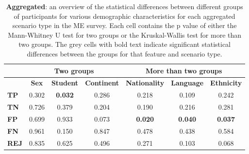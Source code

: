 \begin{table}
    \small
    \centering
    \begin{tabular}{lccc|ccc}
        \toprule
                     & \multicolumn{3}{c}{\textbf{Two groups}} & \multicolumn{3}{c}{\textbf{More than two groups}}                                                                                                                                                                       \\
        \midrule
                     & \multicolumn{1}{c}{\textbf{Sex}}        & \multicolumn{1}{c}{\textbf{Student}}              & \multicolumn{1}{c}{\textbf{Continent}} & \multicolumn{1}{c}{\textbf{Nationality}} & \multicolumn{1}{c}{\textbf{Language}}  & \multicolumn{1}{c}{\textbf{Ethnicity}} \\
        \midrule
        \textbf{TP}  & 0.302                                   & \cellcolor[HTML]{EFEFEF}\textbf{0.032}            & 0.286                                  & 0.218                                    & 0.109                                  & 0.242                                  \\
        \textbf{TN}  & 0.726                                   & 0.379                                             & 0.204                                  & 0.190                                    & 0.216                                  & 0.281                                  \\
        \textbf{FP}  & 0.699                                   & 0.933                                             & 0.073                                  & \cellcolor[HTML]{EFEFEF}\textbf{0.020}   & \cellcolor[HTML]{EFEFEF}\textbf{0.040} & \cellcolor[HTML]{EFEFEF}\textbf{0.037} \\
        \textbf{FN}  & 0.961                                   & 0.150                                             & 0.847                                  & 0.478                                    & 0.438                                  & 0.584                                  \\
        \textbf{REJ} & 0.835                                   & 0.625                                             & 0.496                                  & 0.271                                    & 0.103                                  & 0.068                                  \\
        \bottomrule
    \end{tabular}
    \caption{\textbf{Aggregated}: an overview of the statistical differences between different groups of participants for various demographic characteristics for each aggregated scenario type in the ME survey. Each cell contains the p value of either the Mann-Whitney U test for two groups or the Kruskal-Wallis test for more than two groups. The grey cells with bold text indicate significant statistical differences between the groups for that feature and scenario type.}
    \label{tab:results-differences-grp}
\end{table}

